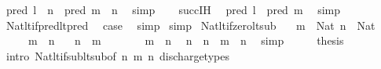\begin{isabellebody}
\ {\isachardoublequoteopen}pred\ l\ {\isacharminus}{\kern0pt}\ n\ {\isacharless}{\kern0pt}\ pred\ m\ {\isacharminus}{\kern0pt}\ n{\isachardoublequoteclose}\ \isamarkupfalse%
\ simp\isanewline
\ \ \isamarkupfalse%
\ succ{\isachardot}{\kern0pt}IH\ \isamarkupfalse%
\ {\isachardoublequoteopen}pred\ l\ {\isacharless}{\kern0pt}\ pred\ m{\isachardoublequoteclose}\ \isamarkupfalse%
\ simp\isanewline
\ \ \isamarkupfalse%
\ Nat{\isacharunderscore}{\kern0pt}lt{\isacharunderscore}{\kern0pt}if{\isacharunderscore}{\kern0pt}pred{\isacharunderscore}{\kern0pt}lt{\isacharunderscore}{\kern0pt}pred\ \isamarkupfalse%
\ {\isacharquery}{\kern0pt}case\ \isamarkupfalse%
\ simp\isanewline
{}\isamarkupfalse%
\ simp%
\endisatagproof
{\isafoldproof}%
%
\isadelimproof
\isanewline
%
\endisadelimproof
\isanewline
{}\isamarkupfalse%
\ Nat{\isacharunderscore}{\kern0pt}lt{\isacharunderscore}{\kern0pt}if{\isacharunderscore}{\kern0pt}zero{\isacharunderscore}{\kern0pt}lt{\isacharunderscore}{\kern0pt}sub{\isacharcolon}{\kern0pt}\isanewline
\ \ \ {\isachardoublequoteopen}m\ {\isacharcolon}{\kern0pt}\ Nat{\isachardoublequoteclose}\ {\isachardoublequoteopen}n\ {\isacharcolon}{\kern0pt}\ Nat{\isachardoublequoteclose}\isanewline
\ \ \ {\isachardoublequoteopen}{}\ {\isacharless}{\kern0pt}\ m\ {\isacharminus}{\kern0pt}\ n{\isachardoublequoteclose}\isanewline
\ \ \ {\isachardoublequoteopen}n\ {\isacharless}{\kern0pt}\ m{\isachardoublequoteclose}\isanewline
%
\isadelimproof
%
\endisadelimproof
%
\isatagproof
{}\isamarkupfalse%
\ {\isacharminus}{\kern0pt}\isanewline
\ \ \isamarkupfalse%
\ {\isacartoucheopen}{}\ {\isacharless}{\kern0pt}\ m\ {\isacharminus}{\kern0pt}\ n{\isacartoucheclose}\ \isamarkupfalse%
\ {\isachardoublequoteopen}n\ {\isacharminus}{\kern0pt}\ n\ {\isacharless}{\kern0pt}\ m\ {\isacharminus}{\kern0pt}\ n{\isachardoublequoteclose}\ \isamarkupfalse%
\ simp\isanewline
\ \ \isamarkupfalse%
\ \isamarkupfalse%
\ {\isacharquery}{\kern0pt}thesis\ \isamarkupfalse%
\ {\isacharparenleft}{\kern0pt}intro\ Nat{\isacharunderscore}{\kern0pt}lt{\isacharunderscore}{\kern0pt}if{\isacharunderscore}{\kern0pt}sub{\isacharunderscore}{\kern0pt}lt{\isacharunderscore}{\kern0pt}sub{\isacharbrackleft}{\kern0pt}of\ n\ m\ n{\isacharbrackright}{\kern0pt}{\isacharparenright}{\kern0pt}\ discharge{\isacharunderscore}{\kern0pt}types\isanewline

\end{isabellebody}
